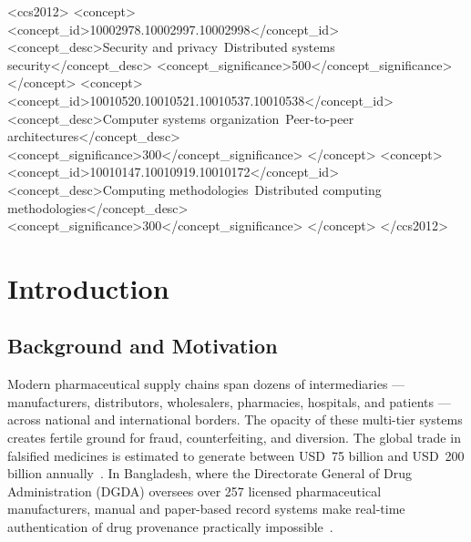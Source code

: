 \documentclass[sigplan,screen,review=false]{acmart}
\begin{document}
\begin{CCSXML}
<ccs2012>
 <concept>
  <concept_id>10002978.10002997.10002998</concept_id>
  <concept_desc>Security and privacy~Distributed systems security</concept_desc>
  <concept_significance>500</concept_significance>
 </concept>
 <concept>
  <concept_id>10010520.10010521.10010537.10010538</concept_id>
  <concept_desc>Computer systems organization~Peer-to-peer architectures</concept_desc>
  <concept_significance>300</concept_significance>
 </concept>
 <concept>
  <concept_id>10010147.10010919.10010172</concept_id>
  <concept_desc>Computing methodologies~Distributed computing methodologies</concept_desc>
  <concept_significance>300</concept_significance>
 </concept>
</ccs2012>
\end{CCSXML}


\maketitle

\section{Introduction}
\label{sec:intro}

\subsection{Background and Motivation}

Modern pharmaceutical supply chains span dozens of intermediaries ---
manufacturers, distributors, wholesalers, pharmacies, hospitals, and
patients --- across national and international borders. The opacity of
these multi-tier systems creates fertile ground for fraud,
counterfeiting, and diversion. The global trade in falsified medicines
is estimated to generate between USD~75 billion and USD~200 billion
annually~\cite{who2017falsified}. In Bangladesh, where the Directorate
General of Drug Administration (DGDA) oversees over 257 licensed
pharmaceutical manufacturers, manual and paper-based record systems
make real-time authentication of drug provenance practically
impossible~\cite{dgda2022annual}.
\end{document}
